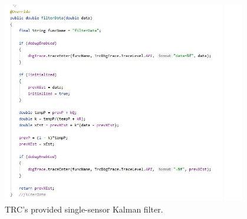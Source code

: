 \begin{figure}[htp]
\centering
\includegraphics[width=0.95\textwidth, angle=0]{Meetings/April/04-07-22/04-07-22 3.JPG}
\caption{TRC's provided single-sensor Kalman filter.}
\label{fig:040722_3}
\end{figure}




